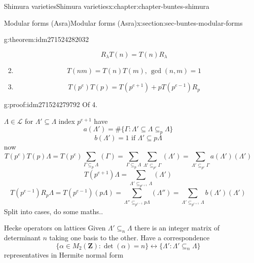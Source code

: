 \documentclass[oneside,10pt,]{book}
\numberwithin{equation}{section}
\newcommand{\ZZ}{\mathbf{Z}}
\begin{document}
\begin{chapterptx}{Shimura varieties}{}{Shimura varieties}{}{}{x:chapter:chapter-buntes-shimura}
\begin{sectionptx}{Modular forms (Asra)}{}{Modular forms (Asra)}{}{}{x:section:sec-buntes-modular-forms}
\begin{theorem}{}{}{g:theorem:idm271524282032}
\begin{enumerate}
\begin{equation*}
R_\lambda T(n) = T(n) R_{\lambda}
\end{equation*}
%
\item{}%
\begin{equation*}
T(nm) = T(n) T(m),\,\gcd(n,m) =1
\end{equation*}
%
\item{}%
\begin{equation*}
T(p^e)T(p) = T(p^{e+1 }) + p T(p^{e-1}) R_p
\end{equation*}
%
\end{enumerate}
%
\end{theorem}
\begin{proofptx}{}{g:proof:idm271524279792}
Of 4.%
\par
\(\Lambda \in \mathcal L\) for \(\Lambda' \subseteq \Lambda \) index \(p^{e+1}\) have%
\begin{equation*}
a(\Lambda')  = \# \{ \Gamma : \Lambda'  \subseteq \Lambda \subseteq_p \Lambda \}
\end{equation*}
%
\begin{equation*}
b(\Lambda')  = 1 \text{ if } \Lambda' \subseteq p\Lambda
\end{equation*}
now%
\begin{equation*}
T(p^e)T(p) \Lambda = T(p^e) \sum_{\Gamma \subseteq_p \Lambda } (\Gamma) = \sum_{\Gamma \subseteq_p \Lambda } \sum_{\Lambda' \subseteq_{p^e} \Gamma} (\Lambda') =\sum_{\Lambda' \subseteq_{p^e} \Gamma}  a(\Lambda') (\Lambda')
\end{equation*}
%
\begin{equation*}
T(p^{e+1} ) \Lambda  =  \sum_{\Lambda'\subseteq_{p^{e+1}} \Lambda} (\Lambda')
\end{equation*}
%
\begin{equation*}
T(p^{e-1} )R_p \Lambda  =  T(p^{e-1}) (p \Lambda) = \sum_{\Lambda'' \subseteq_{p^{e-1}} p\Lambda } (\Lambda'') = \sum_{\Lambda' \subseteq_{p^{e+1}} \Lambda} b(\Lambda') (\Lambda')
\end{equation*}
Split into cases, do some maths..%
\end{proofptx}
Hecke operators on lattices Given \(\Lambda' \subseteq_n \Lambda\) there is an integer matrix of determinant  \(n\) taking one basis to the other. Have a correspondence%
\begin{equation*}
\{ \alpha \in M_2(\ZZ) : \det(\alpha) = n \}  \leftrightarrow \{ \Lambda ' : \Lambda ' \subseteq_n \Lambda\}
\end{equation*}
representatives in Hermite normal form%

\end{sectionptx}
\end{chapterptx}
\end{document}
